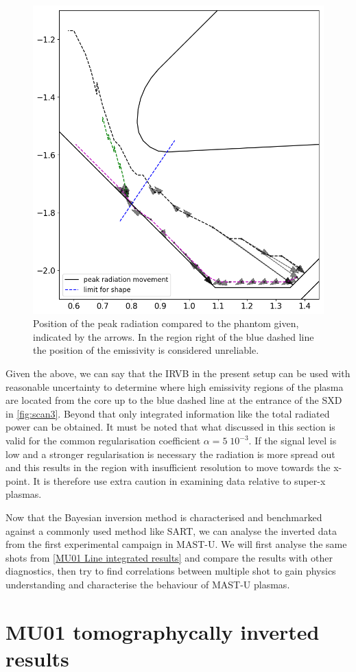 \begin{figure}
	\centering
	\includegraphics[trim={0 0 0 0},clip,width=0.6\linewidth]{Chapters/chapter2/figs/radiation_movement.png}
	\caption{Position of the peak radiation compared to the phantom given, indicated by the arrows. In the region right of the blue dashed line the position of the emissivity is considered unreliable.}
	\label{fig:scan3}
\end{figure}

Given the above, we can say that the IRVB in the present setup can be used with reasonable uncertainty to determine where high emissivity regions of the plasma are located from the core up to the blue dashed line at the entrance of the SXD in \autoref{fig:scan3}. Beyond that only integrated information like the total radiated power can be obtained.
It must be noted that what discussed in this section is valid for the common regularisation coefficient $\alpha=5 \; 10^{-3}$. If the signal level is low and a stronger regularisation is necessary the radiation is more spread out and this results in the region with insufficient resolution to move towards the x-point. It is therefore use extra caution in examining data relative to super-x plasmas.

Now that the Bayesian inversion method is characterised and benchmarked against a commonly used method like SART, we can analyse the inverted data from the first experimental campaign in MAST-U. We will first analyse the same shots from \autoref{MU01 Line integrated results} and compare the results with other diagnostics, then try to find correlations between multiple shot to gain physics understanding and characterise the behaviour of MAST-U plasmas.

\section{MU01 tomographycally inverted results}

